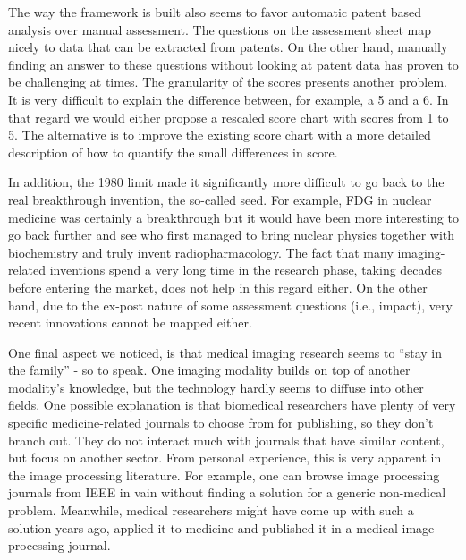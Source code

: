 The way the framework is built also seems to favor automatic patent based
analysis over manual assessment. The questions on the assessment sheet map
nicely to data that can be extracted from patents. On the other hand, manually
finding an answer to these questions without looking at patent data has proven
to be challenging at times. The granularity of the scores presents another
problem. It is very difficult to explain the difference between, for example, a
5 and a 6. In that regard we would either propose a rescaled score chart with
scores from 1 to 5. The alternative is to improve the existing score chart with a more
detailed description of how to quantify the small differences in score.

In addition, the 1980 limit made it significantly more difficult to go back to
the real breakthrough invention, the so-called seed. For example, FDG in nuclear
medicine was certainly a breakthrough but it would have been more interesting to
go back further and see who first managed to bring nuclear physics together with
biochemistry and truly invent radiopharmacology. The fact that many
imaging-related inventions spend a very long time in the research phase, taking
decades before entering the market, does not help in this regard either. On the
other hand, due to the ex-post nature of some assessment questions (i.e.,
impact), very recent innovations cannot be mapped either.

One final aspect we noticed, is that medical imaging research seems to ``stay in
the family'' - so to speak. One imaging modality builds on top of another
modality's knowledge, but the technology hardly seems to diffuse into other
fields. One possible explanation is that biomedical researchers have plenty of
very specific medicine-related journals to choose from for publishing, so they
don't branch out. They do not interact much with journals that have similar
content, but focus on another sector. From personal experience, this is very
apparent in the image processing literature. For example, one can browse image
processing journals from IEEE in vain without finding a solution for a generic
non-medical problem. Meanwhile, medical researchers might have come up with such
a solution years ago, applied it to medicine and published it in a medical image
processing journal.